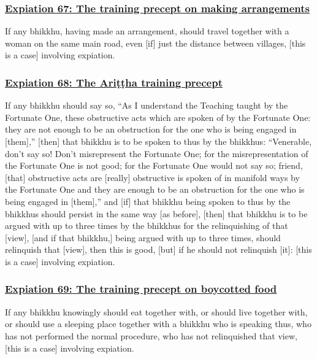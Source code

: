 \subsubsection*{\hyperref[pac67]{Expiation 67: The training precept on making arrangements}}
\label{exp67}
If any bhikkhu, having made an arrangement, should travel together with a woman on the same main road, even [if] just the distance between villages, [this is a case] involving expiation.



\subsubsection*{\hyperref[pac68]{Expiation 68: The Ariṭṭha training precept}}
\label{exp68}
If any bhikkhu should say so, ``As I understand the Teaching taught by the Fortunate One, these obstructive acts which are spoken of by the Fortunate One: they are not enough to be an obstruction for the one who is being engaged in [them],'' [then] that bhikkhu is to be spoken to thus by the bhikkhus: ``Venerable, don't say so! Don't misrepresent the Fortunate One; for the misrepresentation of the Fortunate One is not good; for the Fortunate One would not say so; friend, [that] obstructive acts are [really] obstructive is spoken of in manifold ways by the Fortunate One and they are enough to be an obstruction for the one who is being engaged in [them],'' and [if] that bhikkhu being spoken to thus by the bhikkhus should persist in the same way [as before], [then] that bhikkhu is to be argued with up to three times by the bhikkhus for the relinquishing of that [view], [and if that bhikkhu,] being argued with up to three times, should relinquish that [view], then this is good, [but] if he should not relinquish [it]: [this is a case] involving expiation.



\subsubsection*{\hyperref[pac69]{Expiation 69: The training precept on boycotted food}}
\label{exp69}
If any bhikkhu knowingly should eat together with, or should live together with, or should use a sleeping place together with a bhikkhu who is speaking thus, who has not performed the normal procedure, who has not relinquished that view, [this is a case] involving expiation.



